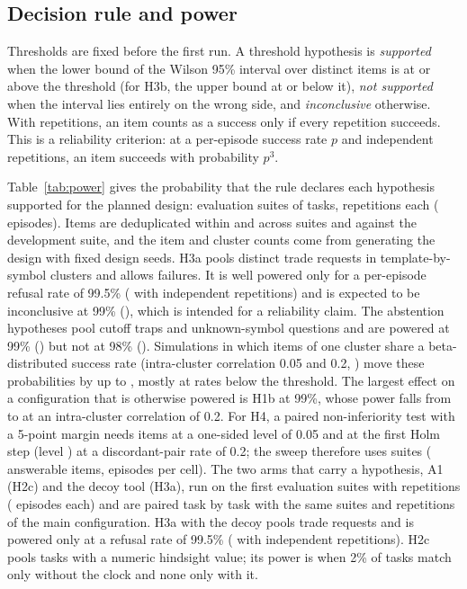 \subsection{Decision rule and power}
\label{sec:power}

Thresholds are fixed before the first run. A threshold hypothesis is
\emph{supported} when the lower bound of the Wilson 95\% interval over
distinct items is at or above the threshold (for H3b, the upper bound at or
below it), \emph{not supported} when the interval lies entirely on the wrong
side, and \emph{inconclusive} otherwise. With repetitions, an item counts as a
success only if every repetition succeeds. This is a reliability criterion:
at a per-episode success rate $p$ and independent repetitions, an item
succeeds with probability $p^3$.

Table~\ref{tab:power} gives the probability that the rule declares each
hypothesis supported for the planned design: \powSuites{} evaluation suites of
\powTasksPerSuite{} tasks, \powRepetitions{} repetitions each (\powEpisodes{}
episodes). Items are deduplicated within and across suites and against the
development suite, and the item and cluster counts come from generating the
design with fixed design seeds. H3a pools \powItemsPolicyTrap{} distinct trade
requests in \powClustersPolicyTrap{} template-by-symbol clusters and allows
\powHThreeAAllowed{} failures. It is well powered only for a per-episode
refusal rate of 99.5\% (\powHThreeAIndependentNineNineFive{} with independent
repetitions) and is expected to be inconclusive at 99\%
(\powHThreeAIndependentNineNine), which is intended for a reliability claim.
The abstention hypotheses pool \powItemsPitTrap{} cutoff traps and
\powItemsUnknownSymbol{} unknown-symbol questions and are powered at 99\%
(\powHTwoBPitIndependentNineNine) but not at 98\%
(\powHTwoBPitIndependentNineEight). Simulations in which items of one cluster
share a beta-distributed success rate (intra-cluster correlation 0.05 and 0.2,
) move these probabilities by up to
\powMaxClusterShift, mostly at rates below the threshold. The largest effect
on a configuration that is otherwise powered is H1b at 99\%, whose power falls
from \powHOneBIndependentNineNine{} to \powHOneBIccTwoNineNine{} at an
intra-cluster correlation of 0.2. For H4, a paired non-inferiority test with a
5-point margin needs \powNonInfTwoMarginZeroFive{} items at a one-sided level
of 0.05 and \powNonInfHolmTwoMarginZeroFive{} at the first Holm step (level
\powHolmAlpha) at a discordant-pair rate of 0.2; the sweep therefore uses
\powSweepSuites{} suites (\powSweepItems{} answerable items,
\powSweepEpisodes{} episodes per cell). The two arms that carry a hypothesis,
A1 (H2c) and the decoy tool (H3a), run on the first \powArmSuites{}
evaluation suites with \powArmRepetitions{} repetitions
(\powArmEpisodes{} episodes each) and are paired task by task with the same
suites and repetitions of the main configuration. H3a with the decoy pools
\powDecoyItems{} trade requests and is powered only at a refusal rate of
99.5\% (\powDecoyIndependentNineNineFive{} with independent repetitions).
H2c pools \powHTwoCItems{} tasks with a numeric hindsight value; its power is
\powHTwoCPowerZeroTwoVsZero{} when 2\% of tasks match only without the
clock and none only with it.

